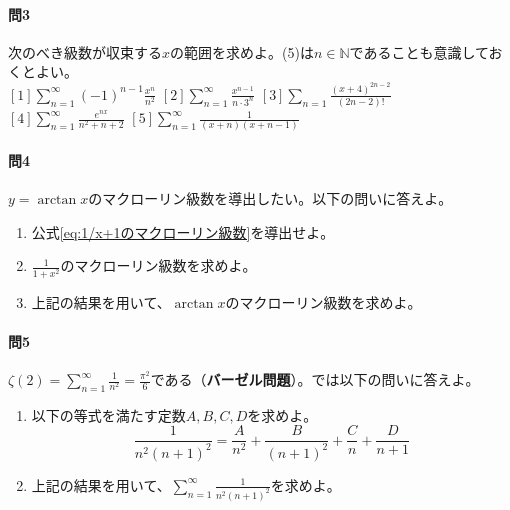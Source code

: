 \documentclass[a4j,dvipdfmx]{jsarticle}
\begin{document}
            \paragraph{問3}次のべき級数が収束する$x$の範囲を求めよ。{\scriptsize (5)は$n\in\mathbb{N}$であることも意識しておくとよい。}\\
            $\displaystyle [1]\sum_{n=1}^{\infty}(-1)^{n-1}\frac{x^n}{n^2}$\hspace{3mm}
            $\displaystyle [2]\sum_{n=1}^{\infty}\frac{x^{n-1}}{n\cdot 3^n}$\hspace{3mm}
            $\displaystyle [3]\sum_{n=1}\frac{(x+4)^{2n-2}}{(2n-2)!}$\hspace{3mm}
            $\displaystyle [4]\sum_{n=1}^{\infty}\frac{e^{nx}}{n^2+n+2}$\hspace{3mm}
            $\displaystyle [5]\sum_{n=1}^{\infty}\frac{1}{(x+n)(x+n-1)}$

            \paragraph{問4}$y=\arctan x$のマクローリン級数を導出したい。以下の問いに答えよ。
            \begin{enumerate}\setcounter{enumi}{0}\renewcommand{\labelenumi}{(\arabic{enumi})}
                \item 公式\eqref{eq:1/x+1のマクローリン級数}を導出せよ。
                \item $\displaystyle \frac{1}{1+x^2}$のマクローリン級数を求めよ。
                \item 上記の結果を用いて、$\arctan x$のマクローリン級数を求めよ。
            \end{enumerate}

            \paragraph{問5}$\displaystyle \zeta(2)= \sum_{n=1}^{\infty}\frac{1}{n^2}=\frac{\pi^2}{6}$である（\textbf{バーゼル問題}）。では以下の問いに答えよ。
            \begin{enumerate}\setcounter{enumi}{0}\renewcommand{\labelenumi}{(\arabic{enumi})}
                \item 以下の等式を満たす定数$A,B,C,D$を求めよ。
                    \begin{equation*}
                        \frac{1}{n^2(n+1)^2}=\frac{A}{n^2}+\frac{B}{(n+1)^2}+\frac{C}{n}+\frac{D}{n+1}
                    \end{equation*}
                \item 上記の結果を用いて、$\displaystyle\sum_{n=1}^{\infty}\frac{1}{n^2(n+1)^2}$を求めよ。
            \end{enumerate}
\end{document}
